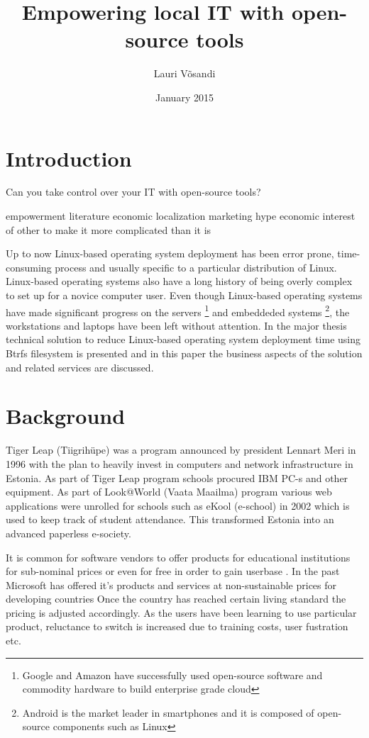 \documentclass{article}
\title{Empowering local IT with open-source tools}
\author{Lauri Võsandi}
\date{January 2015}
\begin{document}
\maketitle

\section{Introduction}

Can you take control over your IT with open-source tools?

empowerment literature
economic 
localization
marketing hype
economic interest of other to make it more complicated than it is

Up to now Linux-based operating system deployment has been
error prone, time-consuming process and usually specific to
a particular distribution of Linux.
Linux-based operating systems also have a long history
of being overly complex to set up for a novice computer user.
Even though Linux-based operating systems have made significant
progress on the servers
\footnote{Google and Amazon have successfully used open-source software
and commodity hardware to build enterprise grade cloud}
and embeddeded systems
\footnote{Android is the market leader in smartphones and it is composed of open-source components such as Linux},
the workstations and laptops have been left without attention.
In the major thesis technical solution to reduce
Linux-based operating system deployment time using
Btrfs filesystem is presented and in this paper the business aspects
of the solution and related services are discussed.


\section{Background}

Tiger Leap (Tiigrihüpe) was a program announced
by president Lennart Meri in 1996 with the plan to heavily invest
in computers and network infrastructure in Estonia.
As part of Tiger Leap program schools procured IBM PC-s and
other equipment.
As part of Look@World (Vaata Maailma) program
various web applications were unrolled for schools such as
eKool (e-school) in 2002 which is used to keep track of student attendance.
This transformed Estonia into an advanced paperless e-society.

It is common for software vendors to offer products for
educational institutions for sub-nominal prices or even for free
in order to gain userbase \cite{dreamspark} \cite{google-for-education}
\cite{apple-education-pricing}.
In the past
Microsoft has offered it's products and services at non-sustainable prices
for developing countries \cite{microsoft-giveaway}
Once the country has reached certain living standard the
pricing is adjusted accordingly.
As the users have been learning to use particular product,
reluctance to switch is increased due to training costs,
user fustration etc. 
\end{document}

